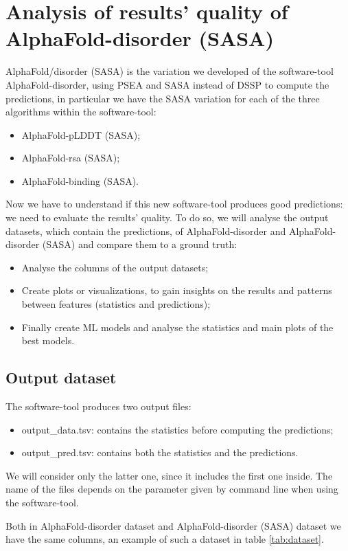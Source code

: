 \chapter{Analysis of results' quality of AlphaFold-disorder (SASA)}
\label{chp:analysis}
AlphaFold/disorder (SASA) is the variation we developed of the software-tool AlphaFold-disorder, using PSEA and SASA instead of DSSP to compute the predictions, in particular we have the SASA variation for each of the three algorithms within the software-tool:
\begin{itemize}
    \item AlphaFold-pLDDT (SASA);
    \item AlphaFold-rsa (SASA);
    \item AlphaFold-binding (SASA).
\end{itemize}

Now we have to understand if this new software-tool produces good predictions: we need to evaluate the results' quality. To do so, we will analyse the output datasets, which contain the predictions, of AlphaFold-disorder and AlphaFold-disorder (SASA) and compare them to a ground truth:
\begin{itemize}
    \item Analyse the columns of the output datasets;
    \item Create plots or visualizations, to gain insights on the results and patterns between features (statistics and predictions);
    \item Finally create ML models and analyse the statistics and main plots of the best models.
\end{itemize}

\section{Output dataset}
The software-tool produces two output files:
\begin{itemize}
    \item output\_data.tsv: contains the statistics before computing the predictions;
    \item output\_pred.tsv: contains both the statistics and the predictions.
\end{itemize}
We will consider only the latter one, since it includes the first one inside. The name of the files depends on the parameter given by command line when using the software-tool. 

Both in AlphaFold-disorder dataset and AlphaFold-disorder (SASA) dataset we have the same columns, an example of such a dataset in table \ref{tab:dataset}.



